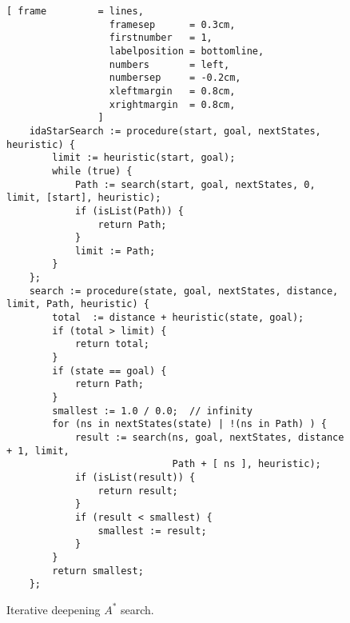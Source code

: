 \begin{figure}[!ht]
\centering
\begin{Verbatim}[ frame         = lines, 
                  framesep      = 0.3cm, 
                  firstnumber   = 1,
                  labelposition = bottomline,
                  numbers       = left,
                  numbersep     = -0.2cm,
                  xleftmargin   = 0.8cm,
                  xrightmargin  = 0.8cm,
                ]
    idaStarSearch := procedure(start, goal, nextStates, heuristic) {
        limit := heuristic(start, goal);
        while (true) {
            Path := search(start, goal, nextStates, 0, limit, [start], heuristic);
            if (isList(Path)) {
                return Path;
            }
            limit := Path;
        }
    };
    search := procedure(state, goal, nextStates, distance, limit, Path, heuristic) {
        total  := distance + heuristic(state, goal);
        if (total > limit) {
            return total;
        }
        if (state == goal) {
            return Path;
        }
        smallest := 1.0 / 0.0;  // infinity
        for (ns in nextStates(state) | !(ns in Path) ) {
            result := search(ns, goal, nextStates, distance + 1, limit, 
                             Path + [ ns ], heuristic);
            if (isList(result)) {
                return result;
            }
            if (result < smallest) {
                smallest := result;
            }
        }
        return smallest;
    };
\end{Verbatim}
\vspace*{-0.3cm}
\caption{Iterative deepening $A^*$ search.}
\label{fig:iterative-deepening-a-star.stlx}
\end{figure}
